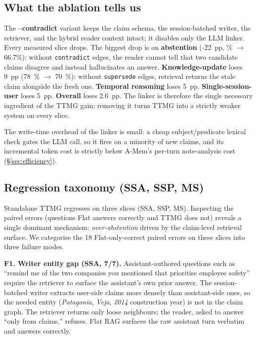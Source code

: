 \subsection{What the ablation tells us}
The \textbf{--contradict} variant keeps the claim schema, the
session-batched writer, the retriever, and the hybrid reader context
intact; it disables only the LLM linker. Every measured slice drops.
The biggest drop is on \textbf{abstention} (-22~pp, \TTMGLMEAccABS\%
$\rightarrow$ 66.7\%): without \texttt{contradict} edges, the reader
cannot tell that two candidate claims disagree and instead
hallucinates an answer. \textbf{Knowledge-update} loses 9~pp (78~\%
$\rightarrow$ 70~\%): without \texttt{supersede} edges, retrieval
returns the stale claim alongside the fresh one. \textbf{Temporal
reasoning} loses 5~pp. \textbf{Single-session-user} loses 5~pp.
\textbf{Overall} loses 2.6~pp. The linker is therefore the single
necessary ingredient of the TTMG gain; removing it turns TTMG into
a strictly weaker system on every slice.

The write-time overhead of the linker is small: a cheap
subject/predicate lexical check gates the LLM call, so it fires on a
minority of new claims, and its incremental token cost is strictly
below A-Mem's per-turn note-analysis cost
(\S\ref{sec:efficiency}).

\subsection{Regression taxonomy (SSA, SSP, MS)}
\label{ssec:qual}

Standalone TTMG regresses on three slices (SSA, SSP, MS). Inspecting
the paired errors (questions Flat answers correctly and TTMG does
not) reveals a single dominant mechanism: \emph{over-abstention}
driven by the claim-level retrieval surface. We categorise the 18
Flat-only-correct paired errors on these slices into three failure
modes.

\textbf{F1. Writer entity gap (SSA, 7/7).} Assistant-authored
questions such as ``remind me of the two companies you mentioned
that prioritise employee safety'' require the retriever to surface
the assistant's own prior answer. The session-batched writer
extracts user-side claims more densely than assistant-side ones, so
the needed entity (\textit{Patagonia}, \textit{Veja}, \textit{2014}
construction year) is not in the claim graph. The retriever returns
only loose neighbours; the reader, asked to answer ``only from
claims,'' refuses. Flat RAG surfaces the raw assistant turn
verbatim and answers correctly.

